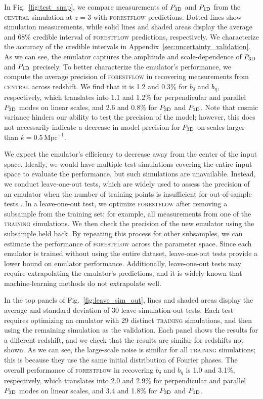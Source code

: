 \documentclass{aa}
\newcommand{\poned}{\ensuremath{P_{\rm 1D}}\xspace}
\newcommand{\pthreed}{\ensuremath{P_{\rm 3D}}\xspace}
\newcommand{\forestflow}{\textsc{forestflow}\xspace}
\newcommand{\lacehc}{\textsc{training}\xspace}
\newcommand{\simcentral}{\textsc{central}\xspace}
\newcommand{\iMpc}{\ensuremath{\,\mathrm{Mpc}^{-1}}}
\begin{document}
In Fig.~\ref{fig:test_snap}, we compare measurements of \pthreed and \poned from the \simcentral simulation at $z=3$ with \forestflow predictions. Dotted lines show simulation measurements, while solid lines and shaded areas display the average and 68\% credible interval of \forestflow predictions, respectively. We characterize the accuracy of the credible intervals in Appendix~\ref{sec:uncertainty_validation}. As we can see, the emulator captures the amplitude and scale-dependence of \pthreed and \poned precisely. To better characterize the emulator's performance, we compute the average precision of \forestflow in recovering measurements from \simcentral across redshift. We find that it is 1.2 and 0.3\% for $b_\delta$ and $b_\eta$, respectively, which translates into 1.1 and 1.2\% for perpendicular and parallel \pthreed modes on linear scales, and 2.6 and 0.8\% for \pthreed and \poned. Note that cosmic variance hinders our ability to test the precision of the model; however, this does not necessarily indicate a decrease in model precision for \pthreed on scales larger than $k=0.5\iMpc$.

We expect the emulator's efficiency to decrease away from the center of the input space. Ideally, we would have multiple test simulations covering the entire input space to evaluate the performance, but such simulations are unavailable. Instead, we conduct leave-one-out tests, which are widely used to assess the precision of an emulator when the number of training points is insufficient for out-of-sample tests \citep[e.g.;][]{hastie01statisticallearning}. In a leave-one-out test, we optimize \forestflow after removing a subsample from the training set; for example, all measurements from one of the \lacehc simulations. We then check the precision of the new emulator using the subsample held back. By repeating this process for other subsamples, we can estimate the performance of \forestflow across the parameter space. Since each emulator is trained without using the entire dataset, leave-one-out tests provide a lower bound on emulator performance. Additionally, leave-one-out tests may require extrapolating the emulator's predictions, and it is widely known that machine-learning methods do not extrapolate well.

In the top panels of Fig.~\ref{fig:leave_sim_out}, lines and shaded areas display the average and standard deviation of 30 leave-simulation-out tests. Each test requires optimizing an emulator with 29 distinct \lacehc simulations, and then using the remaining simulation as the validation. Each panel shows the results for a different redshift, and we check that the results are similar for redshifts not shown. As we can see, the large-scale noise is similar for all \lacehc simulations; this is because they use the same initial distribution of Fourier phases. The overall performance of \forestflow in recovering $b_\delta$ and $b_\eta$ is 1.0 and 3.1\%, respectively, which translates into 2.0 and 2.9\% for perpendicular and parallel \pthreed modes on linear scales, and 3.4 and 1.8\% for \pthreed and \poned.
\end{document}
